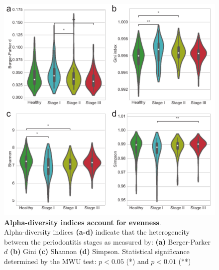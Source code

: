 \documentclass[11pt, a4paper, onecolumn, oneside]{report}
\begin{document}
            \begin{figure}[p]
                \centering
                \includegraphics[width=\linewidth]{Figures/Periodontitis/Figure_R06.pdf}
                \caption[Alpha-diversity indices account for evenness]{\textbf{Alpha-diversity indices account for evenness}. \\
                    Alpha-diversity indices \textbf{(a-d)} indicate that the heterogeneity between the periodontitis stages as measured by: \textbf{(a)} Berger-Parker $d$ \textbf{(b)} Gini \textbf{(c)} Shannon \textbf{(d)} Simpson. Statistical significance determined by the MWU test: $p < 0.05$ (*) and $p < 0.01$ (**)}
                \label{fig:Periodontitis-alpha}
            \end{figure}
            \clearpage
\end{document}
